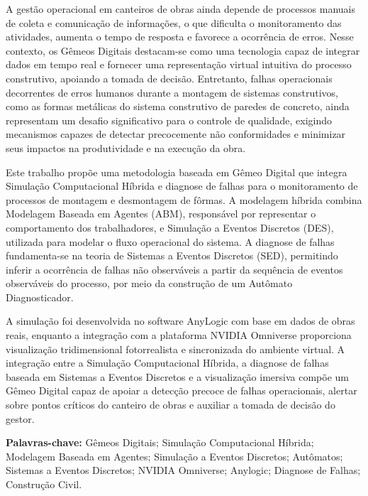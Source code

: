 

\begin{resumo}
	A gestão operacional em canteiros de obras ainda depende de processos manuais de coleta e comunicação de informações, o que dificulta o monitoramento das atividades, aumenta o tempo de resposta e favorece a ocorrência de erros. Nesse contexto, os Gêmeos Digitais destacam-se como uma tecnologia capaz de integrar dados em tempo real e fornecer uma representação virtual intuitiva do processo construtivo, apoiando a tomada de decisão. Entretanto, falhas operacionais decorrentes de erros humanos durante a montagem de sistemas construtivos, como as formas metálicas do sistema construtivo de paredes de concreto, ainda representam um desafio significativo para o controle de qualidade, exigindo mecanismos capazes de detectar precocemente não conformidades e minimizar seus impactos na produtividade e na execução da obra.
	
	Este trabalho propõe uma metodologia baseada em Gêmeo Digital que integra Simulação Computacional Híbrida e diagnose de falhas para o monitoramento de processos de montagem e desmontagem de fôrmas. A modelagem híbrida combina Modelagem Baseada em Agentes (ABM), responsável por representar o comportamento dos trabalhadores, e Simulação a Eventos Discretos (DES), utilizada para modelar o fluxo operacional do sistema. A diagnose de falhas fundamenta-se na teoria de Sistemas a Eventos Discretos (SED), permitindo inferir a ocorrência de falhas não observáveis a partir da sequência de eventos observáveis do processo, por meio da construção de um Autômato Diagnosticador.
	
	A simulação foi desenvolvida no software AnyLogic com base em dados de obras reais, enquanto a integração com a plataforma NVIDIA Omniverse proporciona visualização tridimensional fotorrealista e sincronizada do ambiente virtual. A integração entre a Simulação Computacional Híbrida, a diagnose de falhas baseada em Sistemas a Eventos Discretos e a visualização imersiva compõe um Gêmeo Digital capaz de apoiar a detecção precoce de falhas operacionais, alertar sobre pontos críticos do canteiro de obras e auxiliar a tomada de decisão do gestor.
	
	\vspace{\onelineskip}
	\noindent
	\textbf{Palavras-chave:} Gêmeos Digitais; Simulação Computacional Híbrida; Modelagem Baseada em Agentes; Simulação a Eventos Discretos; Autômatos; Sistemas a Eventos Discretos; NVIDIA Omniverse; Anylogic; Diagnose de Falhas; Construção Civil.
\end{resumo}


